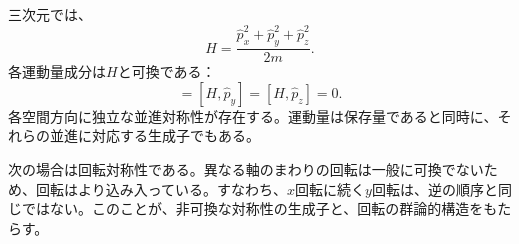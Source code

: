 三次元では、
\begin{equation}
H
=
\frac{\hat p_x^2+\hat p_y^2+\hat p_z^2}{2m}.
\end{equation}
各運動量成分は\(H\)と可換である：
\begin{equation}
[H,\hat p_x]=[H,\hat p_y]=[H,\hat p_z]=0.
\end{equation}
各空間方向に独立な並進対称性が存在する。運動量は保存量であると同時に、それらの並進に対応する生成子でもある。

次の場合は回転対称性である。異なる軸のまわりの回転は一般に可換でないため、回転はより込み入っている。すなわち、\(x\)回転に続く\(y\)回転は、逆の順序と同じではない。このことが、非可換な対称性の生成子と、回転の群論的構造をもたらす。
